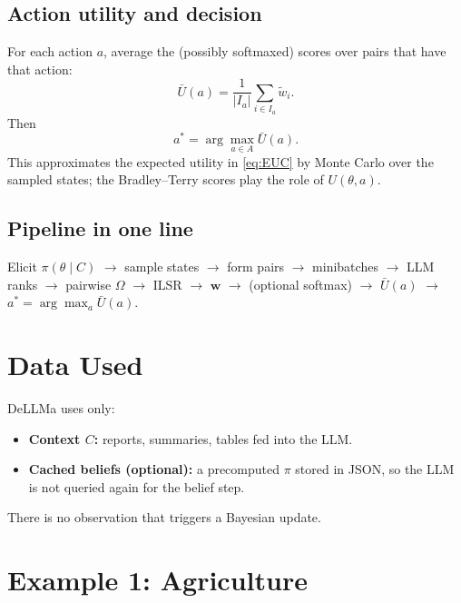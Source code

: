 \documentclass[11pt]{article}
\begin{document}
\subsection{Action utility and decision}

For each action $a$, average the (possibly softmaxed) scores over pairs that have that action:
\begin{equation}\label{eq:Ubar}
\bar{U}(a) = \frac{1}{|I_a|} \sum_{i \in I_a} \tilde{w}_i.
\end{equation}
Then
\begin{equation}\label{eq:MC}
a^* = \arg\max_{a \in A} \bar{U}(a).
\end{equation}
This approximates the expected utility in \eqref{eq:EUC} by Monte Carlo over the sampled states; the Bradley--Terry scores play the role of $U(\theta,a)$.

\subsection{Pipeline in one line}

Elicit $\pi(\theta\mid C)$ $\to$ sample states $\to$ form pairs $\to$ minibatches $\to$ LLM ranks $\to$ pairwise $\Omega$ $\to$ ILSR $\to$ $\mathbf{w}$ $\to$ (optional softmax) $\to$ $\bar{U}(a)$ $\to$ $a^* = \arg\max_a \bar{U}(a)$.

\section{Data Used}

DeLLMa uses only:
\begin{itemize}[leftmargin=*]
\item \textbf{Context $C$:} reports, summaries, tables fed into the LLM.
\item \textbf{Cached beliefs (optional):} a precomputed $\pi$ stored in JSON, so the LLM is not queried again for the belief step.
\end{itemize}
There is no observation that triggers a Bayesian update.

\section{Example 1: Agriculture}
\end{document}
